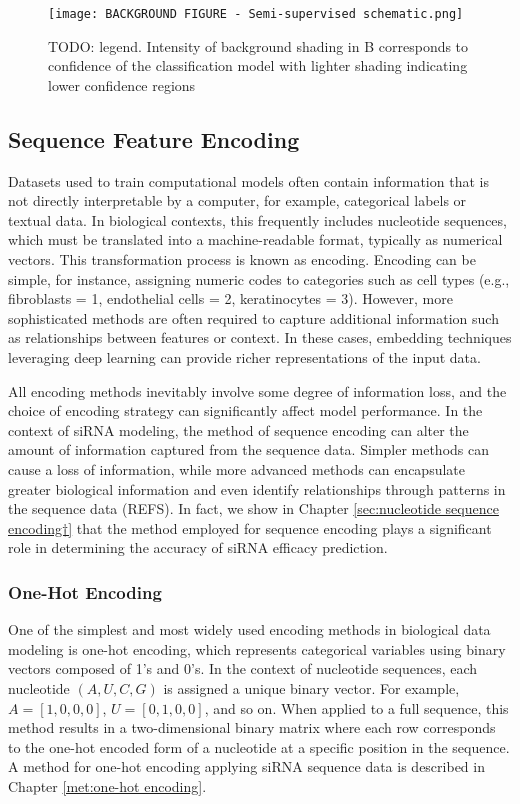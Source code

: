 \documentclass{report}
\begin{document}
\begin{figure}
    \centering
    \texttt{[image: BACKGROUND FIGURE - Semi-supervised  schematic.png]}
    \caption{TODO: legend. 
    Intensity of background shading in B corresponds to confidence of the classification model with lighter shading indicating lower confidence regions}
    \label{fig:Figure+ semi-supervised background}
\end{figure}


\subsection{Sequence Feature Encoding}\label{sec:sequence feature encoding}
Datasets used to train computational models often contain information that is not directly interpretable by a computer, for example, categorical labels or textual data. In biological contexts, this frequently includes nucleotide sequences, which must be translated into a machine-readable format, typically as numerical vectors. This transformation process is known as encoding. Encoding can be simple, for instance, assigning numeric codes to categories such as cell types (e.g., fibroblasts = 1, endothelial cells = 2, keratinocytes = 3). However, more sophisticated methods are often required to capture additional information such as relationships between features or context. In these cases, embedding techniques leveraging deep learning can provide richer representations of the input data.

All encoding methods inevitably involve some degree of information loss, and the choice of encoding strategy can significantly affect model performance. In the context of siRNA modeling, the method of sequence encoding can alter the amount of information captured from the sequence data. Simpler methods can cause a loss of information, while more advanced methods can encapsulate greater biological information and even identify relationships through patterns in the sequence data (REFS). In fact, we show in Chapter \ref{sec:nucleotide sequence encoding†} that the method employed for sequence encoding plays a significant role in determining the accuracy of siRNA efficacy prediction.


\subsubsection{One-Hot Encoding}\label{sec:one-hot encoding}

One of the simplest and most widely used encoding methods in biological data modeling is one-hot encoding, which represents categorical variables using binary vectors composed of 1’s and 0’s. In the context of nucleotide sequences, each nucleotide $(A, U, C, G)$ is assigned a unique binary vector. For example, $A = [1, 0, 0, 0]$, $U = [0, 1, 0, 0]$, and so on. When applied to a full sequence, this method results in a two-dimensional binary matrix where each row corresponds to the one-hot encoded form of a nucleotide at a specific position in the sequence. A method for one-hot encoding applying siRNA sequence data is described in Chapter \ref{met:one-hot encoding}.
\end{document}
